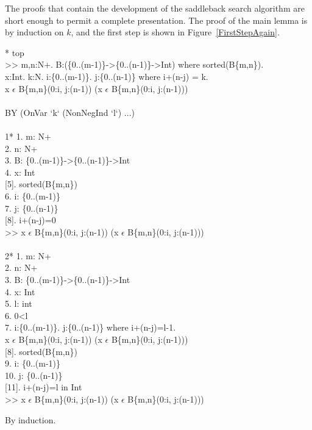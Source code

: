 The proofs that contain the development of the saddleback search algorithm are
short enough to permit a complete presentation.  
The proof of the main lemma is by induction on $k$, and the first step is shown in
Figure~\ref{FirstStepAgain}.
\begin{RuledFigure}
\begin{Screen}{1}{\SnapshotSize}
\N{}* top  \\{}
\N{}>> \mforall{}m,n:N+. \mforall{}B:(\{0..(m-1)\}->\{0..(n-1)\}->Int) where sorted(B\{m,n\}).   \\{}
\N{}     \mforall{}x:Int. \mforall{}k:N. \mforall{}i:\{0..(m-1)\}. \mforall{}j:\{0..(n-1)\} where i+(n-j) = k.  \\{}
\N{}          x \(\epsilon{}\) B\{m,n\}(0:i, j:(n-1))  \mvee{}  \mneg{}(x \(\epsilon{}\) B\{m,n\}(0:i, j:(n-1))) \\{}
\N{} \\{}
\N{}BY (OnVar `k` (NonNegInd `l`) ...) \\{}
\N{} \\{}
\N{}1* 1. m: N+ \\{}
\N{}   2. n: N+ \\{}
\N{}   3. B: \{0..(m-1)\}->\{0..(n-1)\}->Int \\{}
\N{}   4. x: Int \\{}
\N{}   [5]. sorted(B\{m,n\}) \\{}
\N{}   6. i: \{0..(m-1)\} \\{}
\N{}   7. j: \{0..(n-1)\} \\{}
\N{}   [8]. i+(n-j)=0  \\{}
\N{}   >> x \(\epsilon{}\) B\{m,n\}(0:i, j:(n-1))  \mvee{}  \mneg{}(x \(\epsilon{}\) B\{m,n\}(0:i, j:(n-1))) \\{}
\N{} \\{}
\N{}2* 1. m: N+ \\{}
\N{}   2. n: N+ \\{}
\N{}   3. B: \{0..(m-1)\}->\{0..(n-1)\}->Int \\{}
\N{}   4. x: Int \\{}
\N{}   5. l: int \\{}
\N{}   6. 0<l \\{}
\N{}   7. \mforall{}i:\{0..(m-1)\}. \mforall{}j:\{0..(n-1)\} where i+(n-j)=l-1.  \\{}
\N{}         x \(\epsilon{}\) B\{m,n\}(0:i, j:(n-1)) \mvee{}  \mneg{}(x \(\epsilon{}\) B\{m,n\}(0:i, j:(n-1))) \\{}
\N{}   [8]. sorted(B\{m,n\}) \\{}
\N{}   9. i: \{0..(m-1)\} \\{}
\N{}   10. j: \{0..(n-1)\} \\{}
\N{}   [11]. i+(n-j)=l in Int \\{}
\N{}   >> x \(\epsilon{}\) B\{m,n\}(0:i, j:(n-1))  \mvee{}  \mneg{}(x \(\epsilon{}\) B\{m,n\}(0:i, j:(n-1)))    
\end{Screen}%
\caption{By induction.}
\label{FirstStepAgain} 
\end{RuledFigure}
